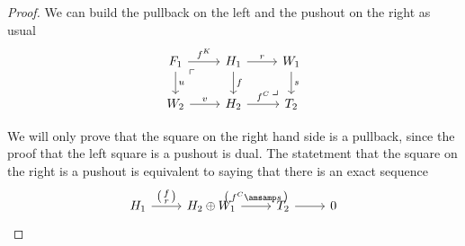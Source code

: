 \begin{proof}
  We can build the pullback on the left and the pushout on the right as usual
  \begin{equation}\label{lem12:eq1}
    \begin{tikzcd}
      F_1\arrow{r}{f^K}\arrow{d}{u}\arrow[phantom,"\ulcorner",very near start]{dr}
        & H_1\arrow{r}{r}\arrow{d}{f}\arrow[phantom,"\lrcorner",very near end]{dr}
          & W_1\arrow{d}{s}\\
      W_2\arrow{r}{v}
        & H_2\arrow{r}{f^C}
          & T_2
    \end{tikzcd}
  \end{equation}

  We will only prove that the square on the right hand side is a pullback, since the proof
  that the left square is a pushout is dual. The statetment that the square on the right is
  a pushout is equivalent to saying that there is an exact sequence
  \begin{equation}\label{lem12:eq2}
    \begin{tikzcd}
      H_1\arrow{r}{
        \begin{psmallmatrix}
          f \\ r
        \end{psmallmatrix}
      }
        & H_2\oplus W_1 \arrow{r}{
          \begin{psmallmatrix}
            f^C \amsamp s
          \end{psmallmatrix}
        }
          & T_2\arrow{r}
            & 0
    \end{tikzcd}
  \end{equation}


\end{proof}
